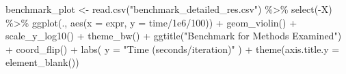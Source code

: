 \documentclass[
  letterpaper,
  DIV=11,
  numbers=noendperiod]{scrreprt}
\newenvironment{Shaded}{\begin{snugshade}}{\end{snugshade}}
\newcommand{\AttributeTok}[1]{\textcolor[rgb]{0.40,0.45,0.13}{#1}}
\newcommand{\DecValTok}[1]{\textcolor[rgb]{0.68,0.00,0.00}{#1}}
\newcommand{\FloatTok}[1]{\textcolor[rgb]{0.68,0.00,0.00}{#1}}
\newcommand{\FunctionTok}[1]{\textcolor[rgb]{0.28,0.35,0.67}{#1}}
\newcommand{\NormalTok}[1]{\textcolor[rgb]{0.00,0.23,0.31}{#1}}
\newcommand{\OtherTok}[1]{\textcolor[rgb]{0.00,0.23,0.31}{#1}}
\newcommand{\SpecialCharTok}[1]{\textcolor[rgb]{0.37,0.37,0.37}{#1}}
\newcommand{\StringTok}[1]{\textcolor[rgb]{0.13,0.47,0.30}{#1}}
\begin{document}
\begin{Shaded}
\begin{Highlighting}[]
\NormalTok{benchmark\_plot }\OtherTok{\textless{}{-}} \FunctionTok{read.csv}\NormalTok{(}\StringTok{"benchmark\_detailed\_res.csv"}\NormalTok{) }\SpecialCharTok{\%\textgreater{}\%}
  \FunctionTok{select}\NormalTok{(}\SpecialCharTok{{-}}\NormalTok{X) }\SpecialCharTok{\%\textgreater{}\%}
  \FunctionTok{ggplot}\NormalTok{(., }\FunctionTok{aes}\NormalTok{(}\AttributeTok{x =}\NormalTok{ expr, }\AttributeTok{y =}\NormalTok{ time}\SpecialCharTok{/}\FloatTok{1e6}\SpecialCharTok{/}\DecValTok{100}\NormalTok{)) }\SpecialCharTok{+} 
  \FunctionTok{geom\_violin}\NormalTok{() }\SpecialCharTok{+} 
  \FunctionTok{scale\_y\_log10}\NormalTok{() }\SpecialCharTok{+} 
  \FunctionTok{theme\_bw}\NormalTok{() }\SpecialCharTok{+} 
  \FunctionTok{ggtitle}\NormalTok{(}\StringTok{"Benchmark for Methods Examined"}\NormalTok{) }\SpecialCharTok{+} 
  \FunctionTok{coord\_flip}\NormalTok{() }\SpecialCharTok{+} 
  \FunctionTok{labs}\NormalTok{(}
    \AttributeTok{y =} \StringTok{"Time (seconds/iteration)"}
\NormalTok{  ) }\SpecialCharTok{+} 
  \FunctionTok{theme}\NormalTok{(}\AttributeTok{axis.title.y =} \FunctionTok{element\_blank}\NormalTok{())}
\end{Highlighting}
\end{Shaded}
\end{document}
